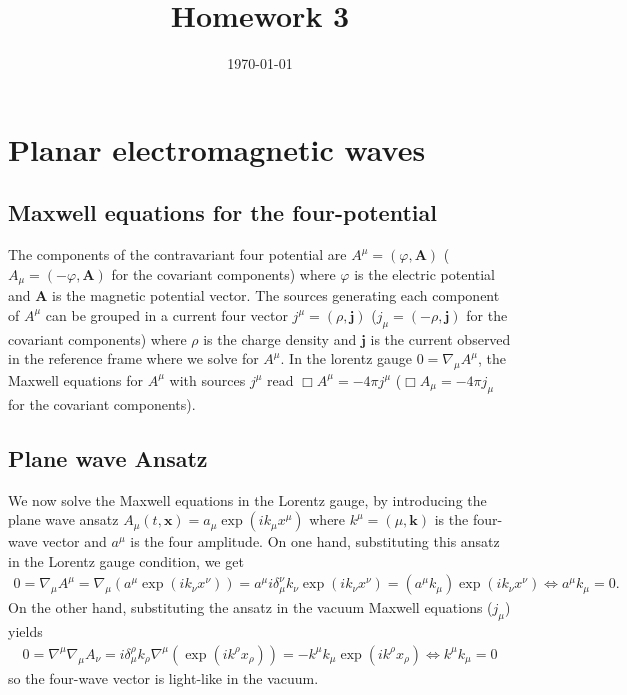 \documentclass[10pt, a4paper]{article}
\title{Homework 3} %
\author{\PA} %
\date{\today} %
\begin{document}
\maketitlepage

\maketableofcontents

\footnotesize{
\section{Planar electromagnetic waves}
\subsection{Maxwell equations for the four-potential}
The components of the contravariant four potential are $A^{\mu} = (\varphi, \mathbf{A})$ ($A_{\mu} = (-\varphi, \mathbf{A})$ for the covariant components) where $\varphi$ is the electric potential and $\mathbf{A}$ is the magnetic potential vector. The sources generating each component of $A^{\mu}$ can be grouped in a current four vector $j^{\mu}=(\rho, \mathbf{j})$ ($j_{\mu} = (-\rho, \mathbf{j})$ for the covariant components) where $\rho$ is the charge density and  $\mathbf{j}$  is the current observed in the reference frame where we solve for $A^{\mu}$. In the lorentz gauge $0=\nabla_{\mu} A^{\mu}$, the Maxwell equations for $A^{\mu}$ with sources $j^{\mu}$ read $\Box A^{\mu} = -4\pi j^{\mu}$ ($\Box A_{\mu} = -4\pi j_{\mu}$ for the covariant components). 

\subsection{Plane wave Ansatz}
We now solve the Maxwell equations in the Lorentz gauge, by introducing the plane wave ansatz $A_\mu(t, \mathbf{x}) = a_\mu \exp \left(i k_\mu x^\mu\right)$ where $k^{\mu}= (\mu, \mathbf{k})$ is the four-wave vector and $a^{\mu}$ is the four amplitude. On one hand, substituting this ansatz in the Lorentz gauge condition, we get 
\begin{align*}
    0 = \nabla_{\mu} A^{\mu} = \nabla_{\mu} \left(a^\mu \exp \left(i k_\nu x^\nu\right)\right) = a^\mu i\delta_\mu^\nu k_{\nu} \exp \left(i k_\nu x^\nu\right) = (a^{\mu} k_{\mu}) \exp \left(i k_\nu x^\nu\right) \iff  a^{\mu} k_{\mu} = 0.
\end{align*}
On the other hand, substituting the ansatz in the vacuum Maxwell equations ($ j_{\mu}$) yields 
\begin{align*}
    0 =  \nabla^{\mu}\nabla_{\mu} A_{\nu} =  i\delta_\mu^\rho k_{\rho} \nabla^{\mu} (\exp \left(i k^\rho x_\rho\right)) = -k^{\mu} k_{\mu} \exp \left(i k^\rho x_\rho\right) \iff k^{\mu} k_{\mu} = 0
\end{align*}
so the four-wave vector is light-like in the vacuum. 

}
\end{document}
